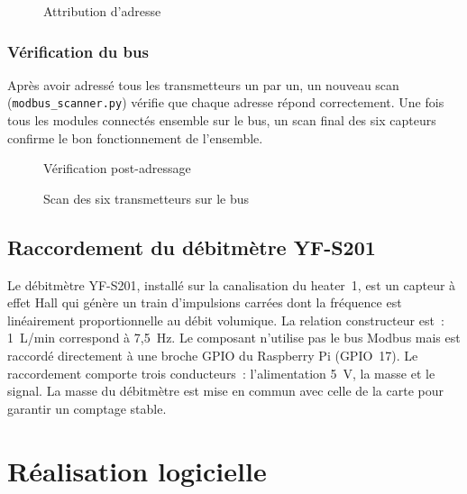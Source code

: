 \begin{figure}[htbp]
  \centering
  \caption{Attribution d'adresse}
  \label{fig:set_address}
\end{figure}

\subsubsection{Vérification du bus}

Après avoir adressé tous les transmetteurs un par un, un nouveau scan (\texttt{modbus\_scanner.py}) vérifie que chaque adresse répond correctement. Une fois tous les modules connectés ensemble sur le bus, un scan final des six capteurs confirme le bon fonctionnement de l'ensemble.

\begin{figure}[htbp]
  \centering
  \caption{Vérification post-adressage}
  \label{fig:rescan}
\end{figure}

\begin{figure}[htbp]
  \centering
  \caption{Scan des six transmetteurs sur le bus}
  \label{fig:scan_all}
\end{figure}

\subsection{Raccordement du débitmètre YF-S201}

Le débitmètre YF-S201, installé sur la canalisation du heater~1, est un capteur à effet Hall qui génère un train d'impulsions carrées dont la fréquence est linéairement proportionnelle au débit volumique. La relation constructeur est~: 1~L/min correspond à 7,5~Hz. Le composant n'utilise pas le bus Modbus mais est raccordé directement à une broche GPIO du Raspberry Pi (GPIO~17). Le raccordement comporte trois conducteurs~: l'alimentation 5~V, la masse et le signal. La masse du débitmètre est mise en commun avec celle de la carte pour garantir un comptage stable.

\section{Réalisation logicielle}

